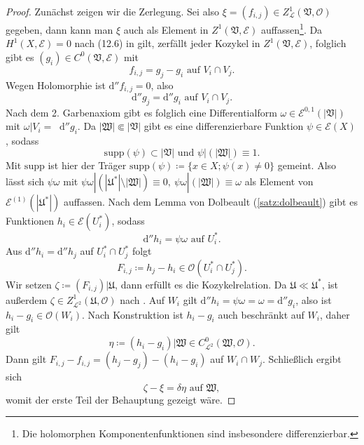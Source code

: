 \documentclass[11pt,a4paper,toc=bibliography]{scrartcl}
\theoremstyle{def}
\theoremstyle{thm}
\theoremstyle{remark}
\newcommand*\dif{\mathop{}\!\mathrm{d}}\newcommand{\einschraenkung}{\,\rule[-5pt]{0.4pt}{12pt}\,{}} %
\begin{document}
\begin{proof}
Zunächst zeigen wir die Zerlegung. Sei also $\xi=(f_{i,j})\in Z^1_{\mathcal{L}}(\mathfrak{V},\mathcal{O})$ gegeben, dann kann man $\xi $ auch als Element in $Z^1(\mathfrak{V},\mathcal{E})$ auffassen\footnote{
Die holomorphen Komponentenfunktionen sind insbesondere differenzierbar.
}.
Da $H^1(X,\mathcal{E})=0$  nach (12.6) in \cite[~S.92]{forster} gilt, zerfällt jeder Kozykel in $Z^1(\mathfrak{V},\mathcal{E})$, folglich gibt es $(g_i)\in C^0(\mathfrak{V},\mathcal{E})$ mit
\[
f_{i,j}=g_j-g_i\text{ auf } V_i\cap V_j.
\]
Wegen Holomorphie ist $\mathrm{d}''f_{i,j}=0$, also 
\[
\mathrm{d}''g_j = \mathrm{d}''g_i\text{ auf } V_i\cap V_j.
\]
Nach dem 2. Garbenaxiom gibt es folglich eine Differentialform $\omega\in\mathcal{E}^{0,1}(|\mathfrak{V}|)$ mit $\omega|V_i=\dif'' g_i$. Da $|\mathfrak{W}|\Subset|\mathfrak{V}|$ gibt es eine differenzierbare Funktion $\psi\in\mathcal{E}(X)$, sodass
\[
\mathrm{supp}(\psi)\subset|\mathfrak{V}|\text{ und } \psi|(|\mathfrak{W}|)\equiv 1. 
\]
Mit $\mathrm{supp}$ ist hier der Träger $\mathrm{supp}(\psi)\coloneqq \overline{\{x\in X; \psi(x)\neq 0\}}$ gemeint.
Also lässt sich $\psi\omega$ mit $\psi\omega|(|\mathfrak{U}^*|\setminus|\mathfrak{W}|)\equiv 0,~\psi\omega|(|\mathfrak{W}|)\equiv \omega$ als Element von $\mathcal{E}^{(1)}(|\mathfrak{U}^*|)$ auffassen. Nach dem Lemma von Dolbeault (\ref{satz:dolbeault}) gibt es Funktionen $h_i\in\mathcal{E}(U_i^*)$, sodass
\[
\mathrm{d}''h_i=\psi\omega\text{ auf } U_i^*.
\]
Aus $\mathrm{d}''h_i=\mathrm{d}''h_j$ auf $U_i^* \cap U_j^*$ folgt
\[
F_{i,j}\coloneqq h_j-h_i\in\mathcal{O}(U_i^*\cap U_j^*).
\]
Wir setzen $\zeta\coloneqq (F_{i,j})|\mathfrak{U}$, dann erfüllt es die Kozykelrelation. Da $\mathfrak{U}\ll\mathfrak{U}^*$, ist außerdem $\zeta\in Z^1_{\mathcal{L}^2}(\mathfrak{U},\mathcal{O})$ nach .
Auf $W_i$ gilt $\mathrm{d}''h_i=\psi\omega=\omega=\mathrm{d}''g_i$, also ist $h_i-g_i\in\mathcal{O}(W_i)$.
Nach Konstruktion ist $h_i-g_i$ auch beschränkt auf $W_i$, daher gilt
\[
\eta\coloneqq (h_i-g_i)|\mathfrak{W}\in C^0_{\mathcal{L}^2}(\mathfrak{W},\mathcal{O}).
\]
Dann gilt $F_{i,j}-f_{i,j}=(h_j-g_j)-(h_i-g_i)$ auf $W_i\cap W_j$. Schließlich ergibt sich
\[
\zeta-\xi=\delta\eta\text{ auf }\mathfrak{W},
\]
womit der erste Teil der Behauptung gezeigt wäre.


\end{proof}
\end{document}
